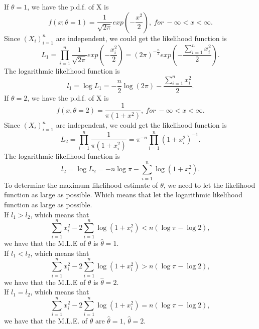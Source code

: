 \documentclass[10.5pt]{article}
\begin{document}
\section{}
If $\theta=1$, we have the p.d.f. of X is $$f(x;\theta=1)=\frac{1}{\sqrt{2\pi}}exp(-\frac{x^2}{2}),~for ~-\infty<x<\infty.$$\indent
Since $(X_i)_{i=1}^n$ are independent, we could get the likelihood function is $$L_1=\prod_{i=1}^n\frac{1}{\sqrt{2\pi}}exp(-\frac{x_i^2}{2})=(2\pi)^{-\frac{n}{2}}exp(-\frac{\sum_{i=1}^nx_i^2}{2}).$$\indent
The logarithmic likelihood function is $$l_1=\log L_1=-\frac{n}{2}\log(2\pi)-\frac{\sum_{i=1}^nx_i^2}{2}.$$\indent
If $\theta=2$, we have the p.d.f. of X is $$f(x,\theta=2)=\frac{1}{\pi(1+x^2)},~for ~-\infty<x<\infty.$$\indent
Since $(X_i)_{i=1}^n$ are independent, we could get the likelihood function is $$L_2=\prod_{i=1}^n\frac{1}{\pi(1+x_i^2)}=\pi^{-n}\prod_{i=1}^n(1+x_i^2)^{-1}.$$\indent
The logarithmic likelihood function is $$l_2=\log L_2=-n\log\pi-\sum_{i=1}^n\log(1+x_i^2).$$\indent
To determine the maximum likelihood estimate of $\theta$, we need to let the likelihood function as large as possible. Which means that let the logarithmic likelihood function as large as possible.\\\indent
If $l_1>l_2$, which means that $$\sum_{i=1}^nx_i^2-2\sum_{i=1}^n\log(1+x_i^2)<n(\log \pi-\log 2),$$\indent
we have that the M.L.E of $\theta$ is $\hat{\theta}=1$.\\\indent
If $l_1<l_2$, which means that $$\sum_{i=1}^nx_i^2-2\sum_{i=1}^n\log(1+x_i^2)>n(\log \pi-\log 2),$$\indent
we have that the M.L.E of $\theta$ is $\hat{\theta}=2$.\\\indent
If $l_1=l_2$, which means that $$\sum_{i=1}^nx_i^2-2\sum_{i=1}^n\log(1+x_i^2)=n(\log \pi-\log 2),$$\indent
we have that the M.L.E. of $\theta$ are $\hat{\theta}=1$, $\hat{\theta}=2$.
\end{document}
